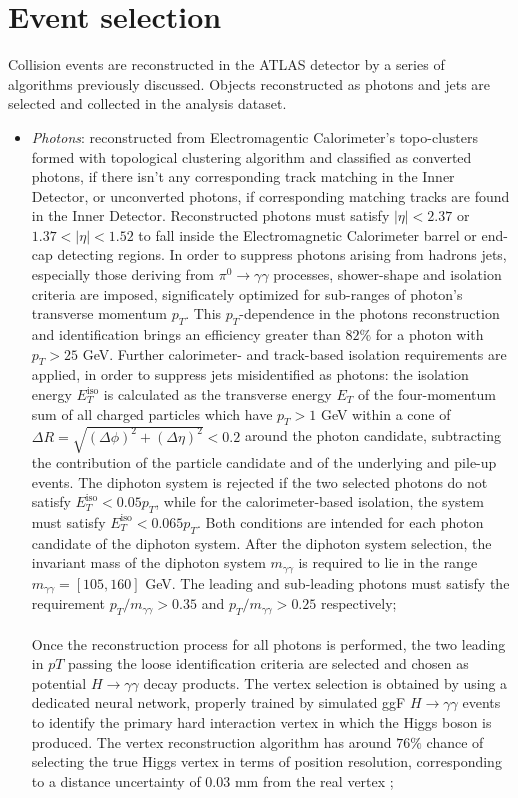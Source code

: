 \section{Event selection}
Collision events are reconstructed in the ATLAS detector by a series of algorithms previously discussed. Objects reconstructed as photons and jets are selected and collected in the analysis dataset.
\begin{itemize}
\item \emph{Photons}: reconstructed from Electromagentic Calorimeter's topo-clusters formed with topological clustering algorithm and classified as converted photons, if there isn't any corresponding track matching in the Inner Detector, or unconverted photons, if corresponding matching tracks are found in the Inner Detector. Reconstructed photons must satisfy $|\eta| < 2.37$ or $1.37 < |\eta| < 1.52$ to fall inside the Electromagnetic Calorimeter barrel or end-cap detecting regions. In order to suppress photons arising from hadrons jets, especially those deriving from $\pi^0 \rightarrow \gamma\gamma$ processes, shower-shape and isolation criteria are imposed, significately optimized for sub-ranges of photon's transverse momentum $p_T$. This $p_T$-dependence in the photons reconstruction and identification brings an efficiency greater than $82\%$ for a photon with $p_T > 25$ GeV. Further calorimeter- and track-based isolation requirements are applied, in order to suppress jets misidentified as photons: the isolation energy $E_T^{\text{iso}}$ is calculated as the transverse energy $E_T$ of the four-momentum sum of all charged particles which have $p_T > 1$ GeV within a cone of $\Delta R  = \sqrt{(\Delta\phi)^2 +(\Delta\eta)^2} < 0.2$ around the photon candidate, subtracting the contribution of the particle candidate and of the underlying and pile-up events. The diphoton system is rejected if the two selected photons do not satisfy $E_T^{\text{iso}} < 0.05 p_T$, while for the calorimeter-based isolation, the system must satisfy $E_T^{\text{iso}} < 0.065 p_T$. Both conditions are intended for each photon candidate of the diphoton system. After the diphoton system selection, the invariant mass of the diphoton system $m_{\gamma\gamma}$ is required to lie in the range $m_{\gamma\gamma} = [105, 160]$ GeV. The leading and sub-leading photons must satisfy the requirement $p_T/m_{\gamma\gamma} > 0.35$ and $p_T/m_{\gamma\gamma} > 0.25$ respectively; 
\\\\
Once the reconstruction process for all photons is performed, the two leading in $pT$ passing the loose identification criteria are selected and chosen as potential $H \rightarrow \gamma\gamma$ decay products. The vertex selection is obtained by using a dedicated neural network, properly trained by simulated ggF $H \rightarrow \gamma\gamma$ events to identify the primary hard interaction vertex in which the Higgs boson is produced. The vertex reconstruction algorithm has around $76\%$ chance of selecting the true Higgs vertex in terms of position resolution, corresponding to a distance uncertainty of $0.03$ mm from the real vertex \cite{ATL-PHYS-PUB-2015-026};


\end{itemize}
